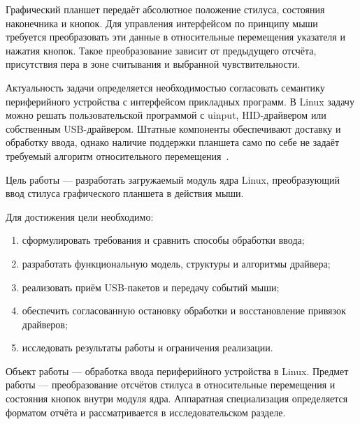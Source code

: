 
Графический планшет передаёт абсолютное положение стилуса, состояния наконечника и кнопок. Для управления интерфейсом по принципу мыши требуется преобразовать эти данные в относительные перемещения указателя и нажатия кнопок. Такое преобразование зависит от предыдущего отсчёта, присутствия пера в зоне считывания и выбранной чувствительности.

Актуальность задачи определяется необходимостью согласовать семантику периферийного устройства с интерфейсом прикладных программ. В Linux задачу можно решать пользовательской программой с uinput, HID-драйвером или собственным USB-драйвером. Штатные компоненты обеспечивают доставку и обработку ввода, однако наличие поддержки планшета само по себе не задаёт требуемый алгоритм относительного перемещения~\cite{kernelusb,uinput,libinput}.

Цель работы --- разработать загружаемый модуль ядра Linux, преобразующий ввод стилуса графического планшета в действия мыши.

Для достижения цели необходимо:
\begin{enumerate}
    \item сформулировать требования и сравнить способы обработки ввода;
    \item разработать функциональную модель, структуры и алгоритмы драйвера;
    \item реализовать приём USB-пакетов и передачу событий мыши;
    \item обеспечить согласованную остановку обработки и восстановление привязок драйверов;
    \item исследовать результаты работы и ограничения реализации.
\end{enumerate}

Объект работы --- обработка ввода периферийного устройства в Linux. Предмет работы --- преобразование отсчётов стилуса в относительные перемещения и состояния кнопок внутри модуля ядра. Аппаратная специализация определяется форматом отчёта и рассматривается в исследовательском разделе.
\clearpage
